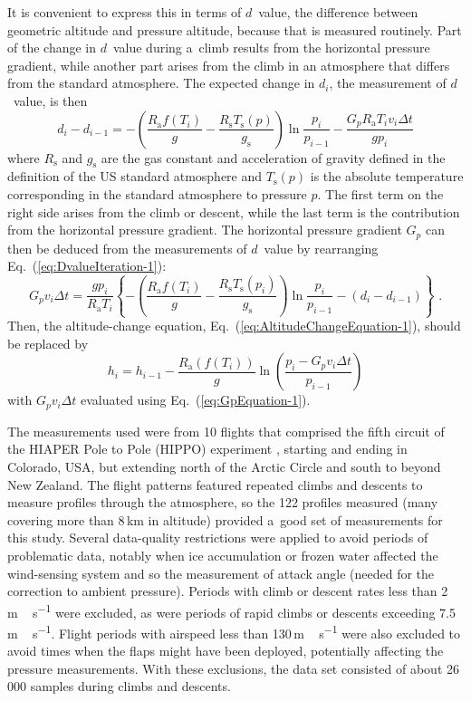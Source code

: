 \documentclass[amtd, online, hvmath]{copernicus}
\begin{document}
It is convenient to express this in terms of $d$~value, the difference
between geometric altitude and pressure altitude, because that is
measured routinely. Part of the change in $d$~value during a~climb
results from the horizontal pressure gradient, while another part
arises from the climb in an atmosphere that differs from the standard
atmosphere.
The expected change in $d_i$, the measurement of $d$~value, is then
\begin{equation}
d_i-d_{i-1}  = -\left(\frac{R_{\mathrm{a}}f(T_i)}{g}-\frac{R_{\mathrm{s}}T_{\mathrm{s}}(p)}{g_{\mathrm{s}}}\right)\ln\frac{p_i}{p_{i-1}}-\frac{G_pR_{\mathrm{a}}T_iv_i\Delta t}{gp_i}\label{eq:DvalueIteration-1}
\end{equation}
where $R_{\mathrm{s}}$ and $g_{\mathrm{s}}$ are the gas constant and
acceleration of gravity defined in the definition of the US standard
atmosphere and $T_{\mathrm{s}}(p)$ is the absolute temperature
corresponding in the standard atmosphere to pressure $p$. The first
term on the right side arises from the climb or descent, while the
last term is the contribution from the horizontal pressure
gradient. The horizontal pressure gradient $G_p$ can then
be deduced from the measurements of $d$~value by rearranging
Eq.~(\ref{eq:DvalueIteration-1}):
\begin{equation}
G_pv_i\Delta t = \frac{gp_i}{R_{\mathrm{a}}T_i}\left\{-\left(\frac{R_{\mathrm{a}}f(T_i)}{g}-\frac{R_{\mathrm{s}}T_{\mathrm{s}}(p_i)}{g_{\mathrm{s}}}\right)\ln\frac{p_i}{p_{i-1}}-(d_i-d_{i-1})\right\}\,\,.\label{eq:GpEquation-1}
\end{equation}
Then, the altitude-change equation,
Eq.~(\ref{eq:AltitudeChangeEquation-1}),
should be replaced by
\begin{equation}
h_i=h_{i-1}-\frac{R_{\mathrm{a}}(f(T_i))}{g}\ln\left(\frac{p_i-G_pv_i\Delta t}{p_{i-1}}\right)\label{eq:AltitudeChangeModifiedForG}
\end{equation}
with $G_pv_i\Delta t$ evaluated using
Eq.~(\ref{eq:GpEquation-1}).

The measurements used were from 10 flights that comprised the fifth
circuit of the HIAPER Pole to Pole (HIPPO) experiment
\citep{wofsy2011hia}, starting and ending in Colorado, USA, but
extending north of the Arctic Circle and south to beyond New
Zealand. The flight patterns featured repeated climbs and descents to
measure profiles through the atmosphere, so the 122 profiles measured
(many covering more than 8\,\unit{km} in altitude) provided a~good set
of measurements for this study. Several data-quality restrictions were
applied to avoid periods of problematic data, notably when ice
accumulation or frozen water affected the wind-sensing system and so
the measurement of attack angle (needed for the correction to ambient
pressure). Periods with climb or descent rates less than
2\,\unit{m\,s^{-1}} were excluded, as were periods of rapid climbs
or descents exceeding 7.5\,\unit{m\,s^{-1}}. Flight periods with
airspeed less than 130\,\unit{m\,s^{-1}} were also excluded to avoid
times when the flaps might have been deployed, potentially affecting
the pressure measurements. With these exclusions, the data set
consisted of about 26\,000 samples during climbs and descents.
\end{document}
